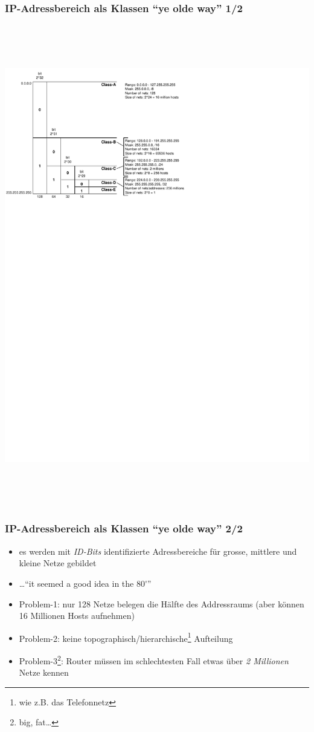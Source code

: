 \documentclass{beamer}
\begin{document}
\begin{frame}
\frametitle{IP-Adressbereich als Klassen ``{\Huge {\frakfamily ye olde way}}'' 1/2}
\begin{center}
\includegraphics[height=21cm]{class-based}
\end{center}
\end{frame}

\begin{frame}
\frametitle{IP-Adressbereich als Klassen ``{\Huge {\frakfamily ye olde way}}'' 2/2}
\begin{itemize}
	\item{es werden mit {\em ID-Bits} identifizierte Adressbereiche f\"ur grosse, mittlere und kleine Netze gebildet}
	\item{\ldots ``it seemed a good idea in the 80\'{}''}
	\item{Problem-1: nur 128 Netze belegen die H\"alfte des Addressraums (aber k\"onnen 16 Millionen Hosts aufnehmen)}
	\item{Problem-2: keine topographisch/hierarchische\footnote{wie z.B. das Telefonnetz} Aufteilung}
	\item{Problem-3\footnote{big, fat\ldots}: Router m\"ussen im schlechtesten Fall etwas \"uber {\em 2 Millionen} Netze kennen}
\end{itemize}
\end{frame}
\end{document}
